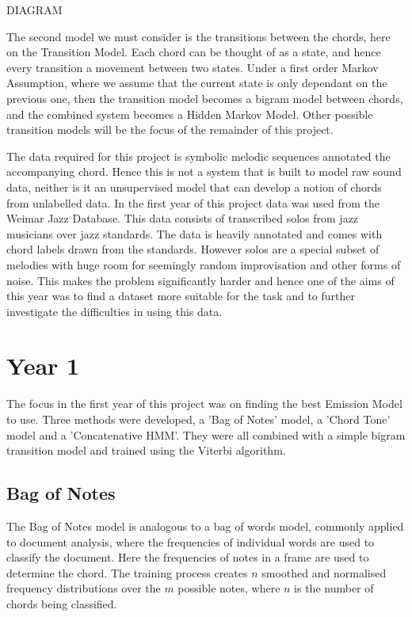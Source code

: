 \documentclass[bsc,logo,twoside,singlespacing,parskip,deptreport]{infthesis}
\begin{document}
DIAGRAM

The second model we must consider is the transitions between the chords, here on the Transition Model. Each chord can be thought of as a state, and hence every transition a movement between two states. Under a first order Markov Assumption, where we assume that the current state is only dependant on the previous one, then the transition model becomes a bigram model between chords, and the combined system becomes a Hidden Markov Model. Other possible transition models will be the focus of the remainder of this project. 

The data required for this project is symbolic melodic sequences annotated the accompanying chord. Hence this is not a system that is built to model raw sound data, neither is it an unsupervised model that can develop a notion of chords from unlabelled data. In the first year of this project data was used from the Weimar Jazz Database. This data consists of transcribed solos from jazz musicians over jazz standards. The data is heavily annotated and comes with chord labels drawn from the standards. However solos are a special subset of melodies with huge room for seemingly random improvisation and other forms of noise. This makes the problem significantly harder and hence one of the aims of this year was to find a dataset more suitable for the task and to further investigate the difficulties in using this data. 

\chapter{Year 1}

The focus in the first year of this project was on finding the best Emission Model to use. Three methods were developed, a 'Bag of Notes' model, a 'Chord Tone' model and a 'Concatenative HMM'. They were all combined with a simple bigram transition model and trained using the Viterbi algorithm.

\section{Bag of Notes}

The Bag of Notes model is analogous to a bag of words model, commonly applied to document analysis, where the frequencies of individual words are used to classify the document. Here the frequencies of notes in a frame are used to determine the chord. The training process creates $n$ smoothed and normalised frequency distributions over the $m$ possible notes, where $n$ is the number of chords being classified. 
\end{document}
